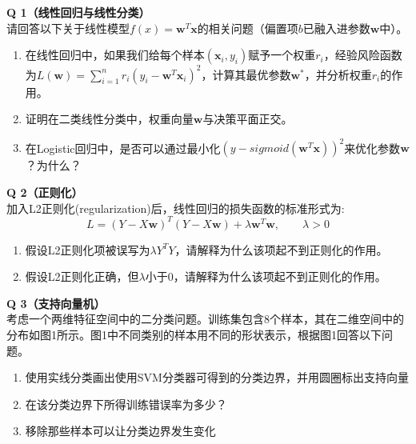 \documentclass[a4paper, 11pt]{article}
\newenvironment{problem}[2][Q]
    { \begin{mdframed}[backgroundcolor=gray!20] \textbf{#1 #2} \\}
    {  \end{mdframed}}
\begin{document}
\begin{CJK}{UTF8}{gbsn}
\begin{problem}{1（线性回归与线性分类）}
请回答以下关于线性模型$f(x)=\bm{w}^T\bm{x}$的相关问题（偏置项$b$已融入进参数$\bm{w}$中）。
\begin{enumerate}[1)]
    \item 在线性回归中，如果我们给每个样本$(\bm{x}_i,y_i)$赋予一个权重$r_i$，经验风险函数为$L(\bm{w})=\sum_{i=1}^nr_i(y_i-\bm{w}^T \bm{x}_i )^2 $，计算其最优参数$\bm{w}^*$，并分析权重$r_i$的作用。
    \item 证明在二类线性分类中，权重向量$\bm{w}$与决策平面正交。
    \item 在Logistic回归中，是否可以通过最小化$(y-sigmoid(\bm{w}^T \bm{x}))^2$来优化参数$\bm{w}$？为什么？
\end{enumerate}
\end{problem}



\begin{problem}{2（正则化）}
加入L2正则化(regularization)后，线性回归的损失函数的标准形式为:
 $$L=(Y-X \bm{w})^T(Y-X \bm{w})+ \lambda \bm{w}^T \bm{w},\qquad \lambda > 0$$
\begin{enumerate}[1)]
    \item 假设L2正则化项被误写为$\lambda Y^ TY$，请解释为什么该项起不到正则化的作用。
    \item 假设L2正则化正确，但$\lambda$小于0，请解释为什么该项起不到正则化的作用。
\end{enumerate}
\end{problem}


\begin{problem}{3（支持向量机）}
考虑一个两维特征空间中的二分类问题。训练集包含8个样本，其在二维空间中的分布如图1所示。图1中不同类别的样本用不同的形状表示，根据图1回答以下问题。
\begin{enumerate}[1)]
    \item 使用实线分类画出使用SVM分类器可得到的分类边界，并用圆圈标出支持向量
    \item 在该分类边界下所得训练错误率为多少？
    \item 移除那些样本可以让分类边界发生变化
\end{enumerate}
\end{problem}


\end{CJK}
\end{document}
